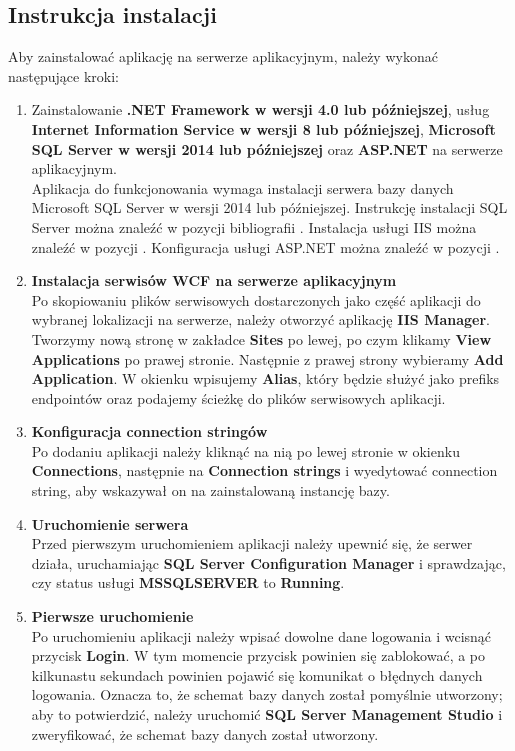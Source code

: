 \documentclass[10pt,a4paper]{article}
\begin{document}
\subsection{Instrukcja instalacji}
Aby zainstalować aplikację na serwerze aplikacyjnym, należy wykonać następujące kroki:
\begin{enumerate}
	\item Zainstalowanie \textbf{.NET Framework w wersji 4.0 lub późniejszej}, usług \textbf{Internet Information Service w wersji 8 lub późniejszej}, \textbf{Microsoft SQL Server w wersji 2014 lub późniejszej} oraz \textbf{ASP.NET} na serwerze aplikacyjnym. \\
	Aplikacja do funkcjonowania wymaga instalacji serwera bazy danych Microsoft SQL Server w wersji 2014 lub późniejszej. Instrukcję instalacji SQL Server można znaleźć w pozycji bibliografii \cite{sqlserver}. Instalacja usługi IIS można znaleźć w pozycji \cite{iis}. Konfiguracja usługi ASP.NET można znaleźć w pozycji \cite{aspnet}.
	\item \textbf{Instalacja serwisów WCF na serwerze aplikacyjnym} \\
	Po skopiowaniu plików serwisowych dostarczonych jako część aplikacji do wybranej lokalizacji na serwerze, należy otworzyć aplikację \textbf{IIS Manager}. Tworzymy nową stronę w zakładce \textbf{Sites} po lewej, po czym klikamy \textbf{View Applications} po prawej stronie. Następnie z prawej strony wybieramy \textbf{Add Application}. W okienku wpisujemy \textbf{Alias}, który będzie służyć jako prefiks endpointów oraz podajemy ścieżkę do plików serwisowych aplikacji.
	\item \textbf{Konfiguracja connection stringów} \\
	Po dodaniu aplikacji należy kliknąć na nią po lewej stronie w okienku \textbf{Connections}, następnie na \textbf{Connection strings} i wyedytować connection string, aby wskazywał on na zainstalowaną instancję bazy.
	\item \textbf{Uruchomienie serwera} \\
	Przed pierwszym uruchomieniem aplikacji należy upewnić się, że serwer działa, uruchamiając \textbf{SQL Server Configuration Manager} i sprawdzając, czy status usługi \textbf{MSSQLSERVER} to \textbf{Running}.
	\item \textbf{Pierwsze uruchomienie} \\
	Po uruchomieniu aplikacji należy wpisać dowolne dane logowania i wcisnąć przycisk \textbf{Login}. W tym momencie przycisk powinien się zablokować, a po kilkunastu sekundach powinien pojawić się komunikat o błędnych danych logowania. Oznacza to, że schemat bazy danych został pomyślnie utworzony; aby to potwierdzić, należy uruchomić \textbf{SQL Server Management Studio} i zweryfikować, że schemat bazy danych został utworzony.

\end{enumerate}
\end{document}
